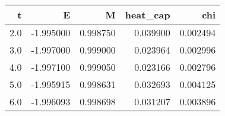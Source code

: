\begin{tabular}{rrrrr}
\toprule
   t &         E &         M &  heat_cap &       chi \\
\midrule
 2.0 & -1.995000 &  0.998750 &  0.039900 &  0.002494 \\
 3.0 & -1.997000 &  0.999000 &  0.023964 &  0.002996 \\
 4.0 & -1.997100 &  0.999050 &  0.023166 &  0.002796 \\
 5.0 & -1.995915 &  0.998631 &  0.032693 &  0.004125 \\
 6.0 & -1.996093 &  0.998698 &  0.031207 &  0.003896 \\
\bottomrule
\end{tabular}

